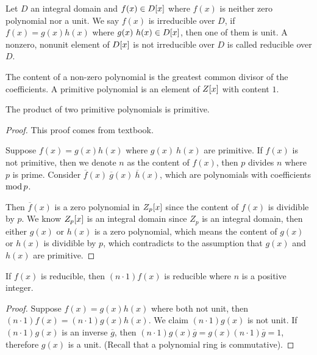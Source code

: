 \documentclass[../main.tex]{subfiles}
\begin{document}
\begin{definition}
  Let $D$ an integral domain and $f(x) \in D[x]$ where $f(x)$ is 
  neither zero polynomial nor a unit. We say $f(x)$ is irreducible over $D$,
  if $f(x) = g(x)h(x)$ where $g(x) \ h(x) \in D[x]$, then one of them is unit.
  A nonzero, nonunit element of $D[x]$ is not irreducible over $D$ is called
  reducible over $D$.
\end{definition}

\begin{definition}[Content]
  The content of a non-zero polynomial is the greatest common divisor of the coefficients.
  A primitive polynomial is an element of $Z[x]$ with content $1$.
\end{definition}

\begin{theorem}
  The product of two primitive polynomials is primitive.
\end{theorem}
\begin{proof}
  This proof comes from textbook.

  Suppose $f(x) = g(x)h(x)$ where $g(x) \ h(x)$ are primitive. If $f(x)$ is not primitive,
  then we denote $n$ as the content of $f(x)$, then $p$ divides $n$ where $p$ is prime.
  Consider $\overline{f}(x) \ \overline{g}(x) \ \overline{h}(x)$, which are polynomials
  with coefficients $\operatorname{mod} p$.

  Then $\overline{f}(x)$ is a zero polynomial in $Z_p[x]$ since the content of $f(x)$
  is dividible by $p$. We know $Z_p[x]$ is an integral domain since $Z_p$ is an
  integral domain, then either $g(x)$ or $h(x)$ is a zero polynomial,
  which means the content of $g(x)$ or $h(x)$ is dividible by $p$,
  which contradicts to the assumption that $g(x)$ and $h(x)$ are primitive.
\end{proof}

\begin{lemma}
  If $f(x)$ is reducible, then $(n \cdot 1)f(x)$ is reducible where $n$ is a positive integer.
\end{lemma}
\begin{proof}
  Suppose $f(x) = g(x)h(x)$ where both not unit, then $(n \cdot 1)f(x) = (n \cdot 1)g(x)h(x)$.
  We claim $(n \cdot 1)g(x)$ is not unit. If $(n \cdot 1) g(x)$ is an inverse $\overline{g}$, then
  $(n \cdot 1) g(x) \overline{g} = g(x) (n \cdot 1) \overline{g} = 1$, therefore $g(x)$ is a unit.
  (Recall that a polynomial ring is commutative).
\end{proof}
\end{document}
